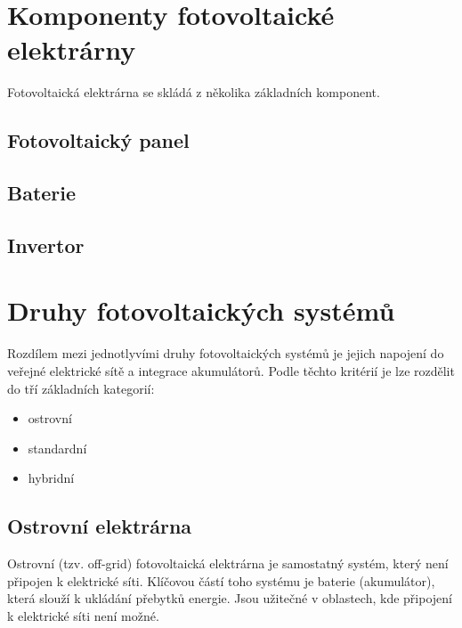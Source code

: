 \section{Komponenty fotovoltaické elektrárny}

Fotovoltaická elektrárna se skládá z několika základních komponent.
\subsection{Fotovoltaický panel}

\subsection{Baterie}

\subsection{Invertor}



\section{Druhy fotovoltaických systémů}

Rozdílem mezi jednotlyvími druhy fotovoltaických systémů je jejich napojení do veřejné elektrické sítě a integrace akumulátorů.
Podle těchto kritérií je lze rozdělit do tří základních kategorií:

\begin{itemize}
    \item ostrovní
    \item standardní
    \item hybridní
\end{itemize}

\subsection{Ostrovní elektrárna}

Ostrovní (tzv. off-grid) fotovoltaická elektrárna je samostatný systém, který není připojen k elektrické síti.
Klíčovou částí toho systému je baterie (akumulátor), která slouží k ukládání přebytků energie.
Jsou užitečné v oblastech, kde připojení k elektrické síti není možné.

\newpage

